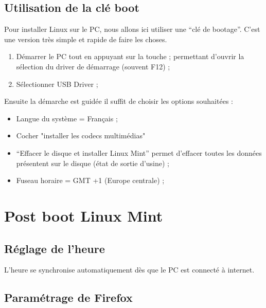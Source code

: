 \documentclass[12pt]{article}
\begin{document}
    \subsection{Utilisation de la clé boot}
        Pour installer Linux sur le PC, nous allons ici utiliser une “clé de bootage”. C’est une version très simple et rapide de faire les choses.
        \begin{enumerate}
            \item Démarrer le PC tout en appuyant sur la touche ; permettant d’ouvrir la sélection du driver de démarrage (souvent F12) ;
            \item Sélectionner USB Driver ;
        \end{enumerate}
        Ensuite la démarche est guidée il suffit de choisir les options souhaitées :
        \begin{itemize}
            \item Langue du système = Français ;
            \item Cocher "installer les codecs multimédias"
            \item “Effacer le disque et installer Linux Mint” permet d’effacer toutes les données présentent sur le disque (état de sortie d’usine) ;
            \item Fuseau horaire = GMT +1 (Europe centrale) ;
        \end{itemize} 

\section{Post boot Linux Mint}
    \subsection{Réglage de l’heure}
        L’heure se synchronise automatiquement dès que le PC est connecté à internet.
    \subsection{Paramétrage de Firefox}
\end{document}
